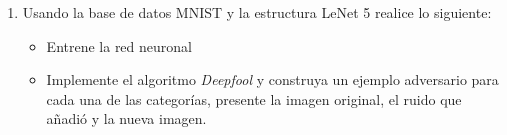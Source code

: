 \documentclass{article}
\begin{document}
\begin{enumerate}
    \item Usando la base de datos MNIST y la estructura LeNet 5 realice lo siguiente:

    \begin{itemize}
        \item Entrene la red neuronal
        \item Implemente el algoritmo \textit{Deepfool} y construya un ejemplo adversario para cada una de las categorías, presente la imagen original, el ruido que añadió y la nueva imagen. 
    \end{itemize}
        
   
\end{enumerate}




 
\end{document}
